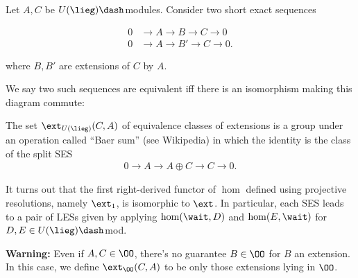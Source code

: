 Let \(A, C\) be \(U(\lieg)\dash\)modules. Consider two short exact
sequences

\begin{align*}
0 &\to A \to B \to C \to 0 \\
0 &\to A \to B' \to C \to 0
.\end{align*}

where \(B, B'\) are extensions of \(C\) by \(A\).

We say two such sequences are equivalent iff there is an isomorphism
making this diagram commute:

\begin{center}
\end{center}

The set \(\ext_{U(\lieg)}(C, A)\) of equivalence classes of extensions
is a group under an operation called ``Baer sum'' (see Wikipedia) in
which the identity is the class of the split SES
\begin{align*}
0 \to A \to A\oplus C \to C \to 0.
\end{align*}

It turns out that the first right-derived functor of \(\hom\) defined
using projective resolutions, namely \(\ext_1\), is isomorphic to
\(\ext\). In particular, each SES leads to a pair of LESs given by
applying \(\hom(\wait, D)\) and \(\hom(E, \wait)\) for
\(D, E \in U(\lieg)\dash\)mod.

\textbf{Warning:} Even if \(A, C\in \OO\), there's no guarantee
\(B\in \OO\) for \(B\) an extension. In this case, we define
\(\ext_\OO(C, A)\) to be only those extensions lying in \(\OO\).

